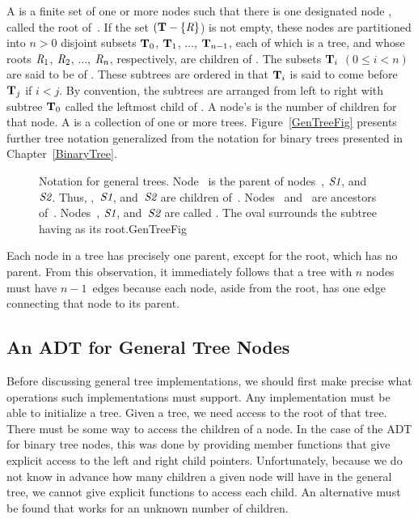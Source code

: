 A   is a finite set of one or more nodes such
that there is one designated node , called the root
of~.
If the set \(({\textbf{T}} -\{{\textit{R}}\}\)) is not empty, these nodes are
partitioned into \(n > 0\) disjoint subsets \({\textbf{T}}_0\),
\({\textbf{T}}_1\), ..., \({\textbf{T}}_{n-1}\), each of which is a tree,
and whose roots \({\textit{R}}_1\), \({\textit{R}}_2\), ..., \({\textit{R}}_n\),
respectively, are children of .
The subsets \({\textbf{T}}_i\) \((0 \leq i < n)\) are said to be
 of .
These subtrees are ordered in that \({\textbf{T}}_i\) is said to come before
\({\textbf{T}}_j\) if \(i < j\).
By convention, the subtrees are arranged from left to right with
subtree \({\textbf{T}}_0\) called the leftmost child of .
A node's   is the number of children for that node.
A  is a collection of one or more trees.
Figure~\ref{GenTreeFig} presents further tree notation generalized
from the notation for binary trees presented in
Chapter~\ref{BinaryTree}.

\begin{figure}
\vspace{-\medskipamount}

{Notation for general trees.
Node~ is the parent of nodes~, \({\textit{S1}}\),
and~\({\textit{S2}}\).
Thus, ,~\({\textit{S1}}\), and~\({\textit{S2}}\) are children
of~.
Nodes~ and~ are ancestors of~.
Nodes~, \({\textit{S1}}\), and~\({\textit{S2}}\) are called
.
The oval surrounds the subtree having  as its root.}{GenTreeFig}
\bigskip
\end{figure}

Each node in a tree has precisely one parent, except for the root,
which has no parent.
From this observation, it immediately follows that a tree with 
\(n\) nodes must have \(n-1\)~edges because each node, aside from the
root, has one edge connecting that node to its parent.

\subsection{An ADT for General Tree Nodes}

Before discussing general tree implementations, we should first make
precise what operations such implementations must support.
Any implementation must be able to initialize a tree.
Given a tree, we need access to the root of that tree.
There must be some way to access the children of a node.
In the case of the ADT for binary tree nodes, this was done by
providing member functions that give explicit access to the left and
right child pointers.
Unfortunately, because we do not know in advance how many children a
given node will have in the general tree, we cannot give explicit
functions to access each child.
An alternative must be found that works for an unknown number of
children.

